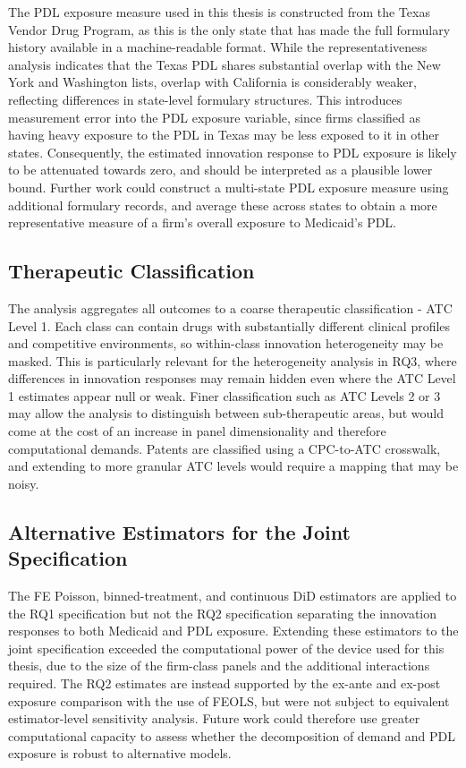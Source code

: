 \documentclass[12pt]{article}
\begin{document}
The PDL exposure measure used in this thesis is constructed from the Texas Vendor Drug Program, as this is the only state that has made the full formulary history available in a machine-readable format. While the representativeness analysis indicates that the Texas PDL shares substantial overlap with the New York and Washington lists, overlap with California is considerably weaker, reflecting differences in state-level formulary structures. This introduces measurement error into the PDL exposure variable, since firms classified as having heavy exposure to the PDL in Texas may be less exposed to it in other states. Consequently, the estimated innovation response to PDL exposure is likely to be attenuated towards zero, and should be interpreted as a plausible lower bound. Further work could construct a multi-state PDL exposure measure using additional formulary records, and average these across states to obtain a more representative measure of a firm's overall exposure to Medicaid's PDL.

\subsection{Therapeutic Classification}

The analysis aggregates all outcomes to a coarse therapeutic classification - ATC Level 1. Each class can contain drugs with substantially different clinical profiles and competitive environments, so within-class innovation heterogeneity may be masked. This is particularly relevant for the heterogeneity analysis in RQ3, where differences in innovation responses may remain hidden even where the ATC Level 1 estimates appear null or weak. Finer classification such as ATC Levels 2 or 3 may allow the analysis to distinguish between sub-therapeutic areas, but would come at the cost of an increase in panel dimensionality and therefore computational demands. Patents are classified using a CPC-to-ATC crosswalk, and extending to more granular ATC levels would require a mapping that may be noisy.

\subsection{Alternative Estimators for the Joint Specification}

The FE Poisson, binned-treatment, and continuous DiD estimators are applied to the RQ1 specification but not the RQ2 specification separating the innovation responses to both Medicaid and PDL exposure. Extending these estimators to the joint specification exceeded the computational power of the device used for this thesis, due to the size of the firm-class panels and the additional interactions required. The RQ2 estimates are instead supported by the ex-ante and ex-post exposure comparison with the use of FEOLS, but were not subject to equivalent estimator-level sensitivity analysis. Future work could therefore use greater computational capacity to assess whether the decomposition of demand and PDL exposure is robust to alternative models.
\end{document}

